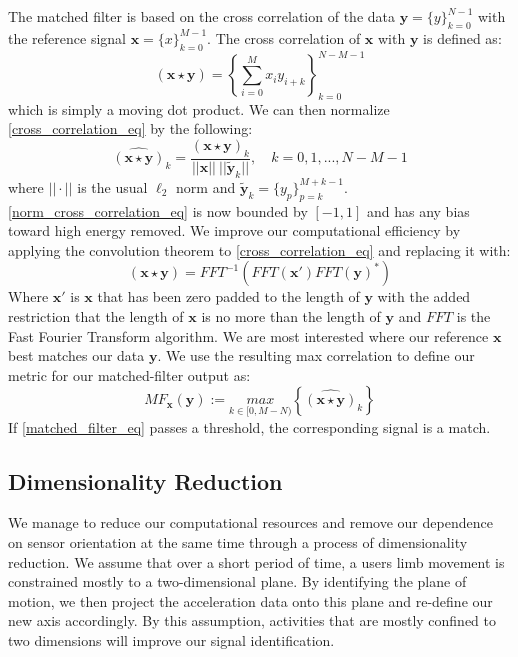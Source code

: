 \documentclass[journal]{IEEEtran}
\begin{document}
The matched filter is based on the cross correlation of the data $\textbf{y} = \{y\}_{k=0}^{N-1}$ with the reference signal $\textbf{x} = \{x\}_{k=0}^{M-1}$.
The cross correlation of $\textbf{x}$ with $\textbf{y}$ is defined as:
%
\begin{equation} \label{cross_correlation_eq}
(\textbf{x} \star \textbf{y}) = \left \{\sum_{i=0}^{M}x_{i} y_{i+k} \right \}_{k=0}^{N-M-1}
\end{equation}
%
which is simply a moving dot product.
We can then normalize \eqref{cross_correlation_eq} by the following:
%
\begin{equation} \label{norm_cross_correlation_eq}
\widehat{(\textbf{x} \star \textbf{y})}_k = \frac{(\textbf{x} \star \textbf{y})_k}{||\textbf{x}|| \ || \widetilde{\textbf{y}}_k || }, \quad k = 0,1,...,N-M-1
\end{equation}
%
where $|| \cdot ||$ is the usual $\ell_2$ norm and $\widetilde{\textbf{y}}_k = \{y_p\}_{p=k}^{M+k-1}$.
\eqref{norm_cross_correlation_eq} is now bounded by $[-1,1]$ and has any bias toward high energy removed.
We improve our computational efficiency by applying the convolution theorem to \eqref{cross_correlation_eq} and replacing it with:
%
\begin{equation} \label{conv_theorem}
(\textbf{x} \star \textbf{y}) = FFT^{-1}(FFT(\textbf{x}') FFT(\textbf{y})^*)
\end{equation}
%
Where $\textbf{x}'$ is $\textbf{x}$ that has been zero padded to the length of $\textbf{y}$ with the added restriction that the length of $\textbf{x}$ is no more than the length of $\textbf{y}$ and $FFT$ is the Fast Fourier Transform algorithm.
We are most interested where our reference $\textbf{x}$ best matches our data $\textbf{y}$.
We use the resulting max correlation to define our metric for  our matched-filter output as:
%
\begin{equation} \label{matched_filter_eq}
MF_{\textbf{x}}(\textbf{y}) := \underset{k \in [0, M-N)}{max} \left \{\widehat{(\textbf{x} \star \textbf{y})}_k \right \}
\end{equation}
%
If \eqref{matched_filter_eq} passes a threshold, the corresponding signal is a match.
%
\subsection{Dimensionality Reduction}
We manage to reduce our computational resources and remove our dependence on sensor orientation at the same time through a process of dimensionality reduction.
We assume that over a short period of time, a user\textquotesingle s limb movement is constrained mostly to a two-dimensional plane.
By identifying the plane of motion, we then project the acceleration data onto this plane and re-define our new axis accordingly.
By this assumption, activities that are mostly confined to two dimensions will improve our signal identification.
\end{document}
